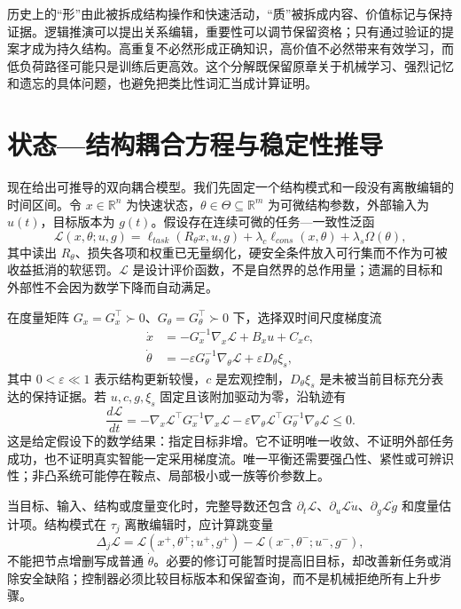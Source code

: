 历史上的“形”由此被拆成结构操作和快速活动，“质”被拆成内容、价值标记与保持证据。逻辑推演可以提出关系编辑，重要性可以调节保留资格；只有通过验证的提案才成为持久结构。高重复不必然形成正确知识，高价值不必然带来有效学习，而低负荷路径可能只是训练后更高效。这个分解既保留原章关于机械学习、强烈记忆和遗忘的具体问题，也避免把类比性词汇当成计算证明。

\section{状态—结构耦合方程与稳定性推导}
\label{sec:section_2061}

现在给出可推导的双向耦合模型。我们先固定一个结构模式和一段没有离散编辑的时间区间。令 $x\in\mathbb R^n$ 为快速状态，$\theta\in\Theta\subseteq\mathbb R^m$ 为可微结构参数，外部输入为 $u(t)$，目标版本为 $g(t)$。假设存在连续可微的任务—一致性泛函
\begin{equation}
 \mathcal L(x,\theta;u,g)=\ell_{task}(R_\theta x,u,g)
 +\lambda_c\ell_{cons}(x,\theta)+\lambda_s\Omega(\theta),
 \label{eq:state_structure_objective}
\end{equation}
其中读出 $R_\theta$、损失各项和权重已无量纲化，硬安全条件放入可行集而不作为可被收益抵消的软惩罚。$\mathcal L$ 是设计评价函数，不是自然界的总作用量；遗漏的目标和外部性不会因为数学下降而自动满足。

在度量矩阵 $G_x=G_x^\top\succ0$、$G_\theta=G_\theta^\top\succ0$ 下，选择双时间尺度梯度流
\begin{align}
 \dot x&=-G_x^{-1}\nabla_x\mathcal L+B_xu+C_xc,\\
 \dot\theta&=-\varepsilon G_\theta^{-1}\nabla_\theta\mathcal L
 +\varepsilon D_\theta\xi_s,
 \label{eq:coupled_state_structure_flow}
\end{align}
其中 $0<\varepsilon\ll1$ 表示结构更新较慢，$c$ 是宏观控制，$D_\theta\xi_s$ 是未被当前目标充分表达的保持证据。若 $u,c,g,\xi_s$ 固定且该附加驱动为零，沿轨迹有
\begin{equation}
 \frac{d\mathcal L}{dt}=-\nabla_x\mathcal L^\top G_x^{-1}\nabla_x\mathcal L
 -\varepsilon\nabla_\theta\mathcal L^\top G_\theta^{-1}\nabla_\theta\mathcal L\le0.
 \label{eq:coupled_descent_result}
\end{equation}
这是给定假设下的数学结果：指定目标非增。它不证明唯一收敛、不证明外部任务成功，也不证明真实智能一定采用梯度流。唯一平衡还需要强凸性、紧性或可辨识性；非凸系统可能停在鞍点、局部极小或一族等价参数上。

当目标、输入、结构或度量变化时，完整导数还包含 $\partial_t\mathcal L$、$\partial_u\mathcal L\dot u$、$\partial_g\mathcal L\dot g$ 和度量估计项。结构模式在 $\tau_j$ 离散编辑时，应计算跳变量
\begin{equation}
 \Delta_j\mathcal L=\mathcal L(x^+,\theta^+;u^+,g^+)
 -\mathcal L(x^-,\theta^-;u^-,g^-),
\end{equation}
不能把节点增删写成普通 $\dot\theta$。必要的修订可能暂时提高旧目标，却改善新任务或消除安全缺陷；控制器必须比较目标版本和保留查询，而不是机械拒绝所有上升步骤。

